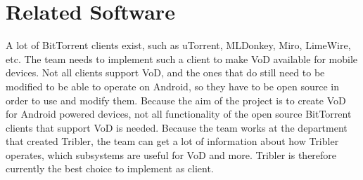 \section{Related Software}
A lot of BitTorrent clients exist, such as uTorrent, MLDonkey, Miro, LimeWire, etc. The team needs to implement such a client to make VoD available for mobile devices. Not all clients support VoD, and the ones that do still need to be modified to be able to operate on Android, so they have to be open source in order to use and modify them. Because the aim of the project is to create VoD for Android powered devices, not all functionality of the open source BitTorrent clients that support VoD is needed. Because the team works at the department that created Tribler, the team can get a lot of information about how Tribler operates, which subsystems are useful for VoD and more. Tribler is therefore currently the best choice to implement as client.